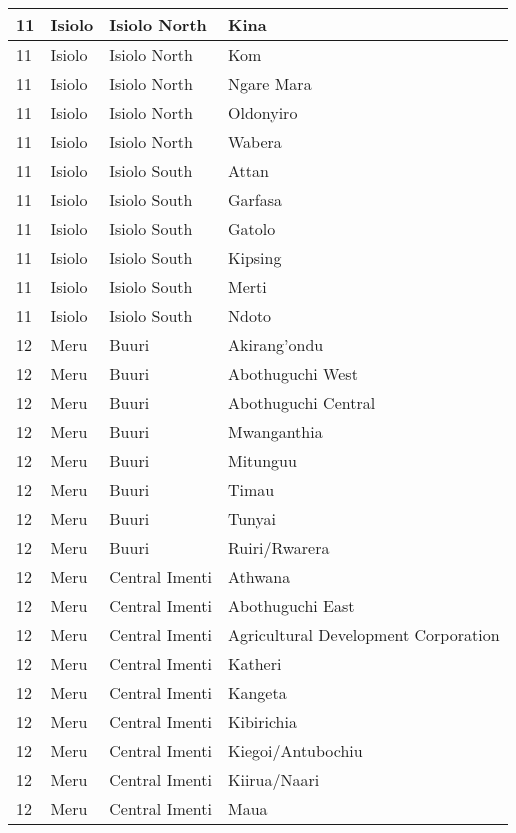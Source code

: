 \begin{table}[!ht]
\begin{tabular}{|l|l|l|l|}
        11 & Isiolo & Isiolo North & Kina \\ \hline
        11 & Isiolo & Isiolo North & Kom \\ \hline
        11 & Isiolo & Isiolo North & Ngare Mara \\ \hline
        11 & Isiolo & Isiolo North & Oldonyiro \\ \hline
        11 & Isiolo & Isiolo North & Wabera \\ \hline
        11 & Isiolo & Isiolo South & Attan \\ \hline
        11 & Isiolo & Isiolo South & Garfasa \\ \hline
        11 & Isiolo & Isiolo South & Gatolo \\ \hline
        11 & Isiolo & Isiolo South & Kipsing \\ \hline
        11 & Isiolo & Isiolo South & Merti \\ \hline
        11 & Isiolo & Isiolo South & Ndoto \\ \hline
        12 & Meru & Buuri & Akirang’ondu \\ \hline
        12 & Meru & Buuri & Abothuguchi West \\ \hline
        12 & Meru & Buuri & Abothuguchi Central \\ \hline
        12 & Meru & Buuri & Mwanganthia \\ \hline
        12 & Meru & Buuri & Mitunguu \\ \hline
        12 & Meru & Buuri & Timau \\ \hline
        12 & Meru & Buuri & Tunyai \\ \hline
        12 & Meru & Buuri & Ruiri/Rwarera \\ \hline
        12 & Meru & Central Imenti & Athwana \\ \hline
        12 & Meru & Central Imenti & Abothuguchi East \\ \hline
        12 & Meru & Central Imenti & Agricultural Development Corporation \\ \hline
        12 & Meru & Central Imenti & Katheri \\ \hline
        12 & Meru & Central Imenti & Kangeta \\ \hline
        12 & Meru & Central Imenti & Kibirichia \\ \hline
        12 & Meru & Central Imenti & Kiegoi/Antubochiu \\ \hline
        12 & Meru & Central Imenti & Kiirua/Naari \\ \hline
        12 & Meru & Central Imenti & Maua \\ \hline

\end{tabular}
\end{table}
